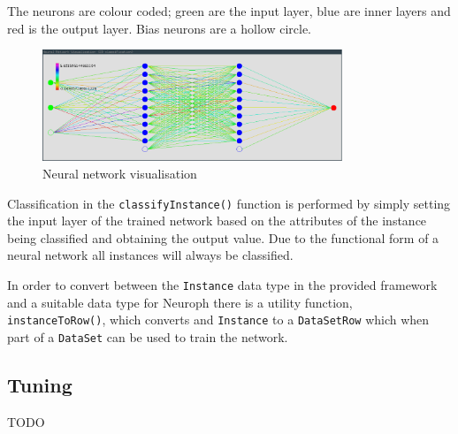 \documentclass[a4paper]{article}
\begin{document}
The neurons are colour coded; green are the input layer, blue are inner layers
and red is the output layer. Bias neurons are a hollow circle.

\begin{figure}[h!]
  \centering
  \includegraphics[width=0.8\textwidth]{graphics/nn_vis.eps}
  \caption{Neural network visualisation}
  \label{fig:nn_vis}
\end{figure}

Classification in the \texttt{classifyInstance()} function is performed by
simply setting the input layer of the trained network based on the attributes of
the instance being classified and obtaining the output value. Due to the
functional form of a neural network all instances will always be classified.

In order to convert between the \texttt{Instance} data type in the provided
framework and a suitable data type for Neuroph there is a utility function,
\texttt{instanceToRow()}, which converts and \texttt{Instance} to a
\texttt{DataSetRow} which when part of a \texttt{DataSet} can be used to train
the network.

\subsection{Tuning}
\label{sec:nn_tuning}

TODO
\end{document}
